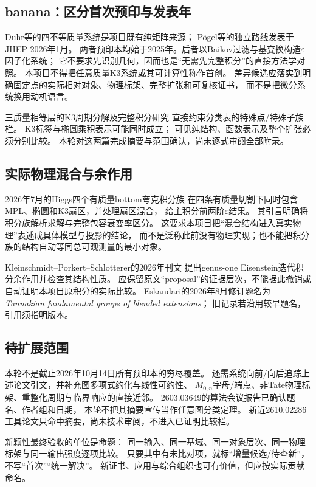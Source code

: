 \documentclass[11pt,a4paper]{ctexart}
\theoremstyle{cnplain}\newtheorem{proposition}{命题}[section]
\begin{document}
\subsection{banana：区分首次预印与发表年}
Duhr等\cite{DMPS}的四不等质量系统是项目既有纯矩阵来源；
Pögel等\cite{PTWW}的独立路线发表于JHEP 2026年1月。
两者预印本均始于2025年。后者以Baikov过滤与基变换构造$\varepsilon$因子化系统；
它不要求先识别几何，因而也是“无需先完整积分”的直接方法学对照。
本项目不得把任意质量K3系统或其可计算性称作首创。
差异候选应落实到明确固定点的实际相对对象、物理标架、完整扩张和可复核证书，
而不是把微分系统换用动机语言。

三质量相等层的K3周期分解及完整积分研究\cite{DM,DMfull}
直接约束分类表的特殊点/特殊子族栏。
K3标签与椭圆乘积表示可能同时成立；
可见纯结构、函数表示及整个扩张必须分别比较。
本轮对这两篇完成摘要与范围确认，尚未逐式审阅全部附录。

\subsection{实际物理混合与余作用}
2026年7月的Higgs四个有质量bottom夸克积分族\cite{WWW}
在四条有质量切割下同时包含MPL、椭圆和K3扇区，并处理扇区混合，
给主积分前两阶$\varepsilon$结果。
其引言明确将积分族解析求解与完整包容衰变率区分。
这要求本项目把“混合结构进入真实物理”表述成具体模型与投影的结论，
而不是泛称此前没有物理实现；也不能把积分族的结构自动等同总可观测量的最小对象。

Kleinschmidt--Porkert--Schlotterer的2026年刊文\cite{KPS}
提出genus-one Eisenstein迭代积分余作用并检查其结构性质。
应保留原文“proposal”的证据层次，不能据此撤销或自动证明本项目原积分的实际比较。
Eskandari的2026年8月修订\cite{Esk}题名为
\emph{Tannakian fundamental groups of blended extensions}；
旧记录若沿用较早题名，引用须指明版本。

\subsection{待扩展范围}
本轮不是截止2026年10月14日所有预印本的穷尽覆盖。
还需系统向前/向后追踪上述论文引文，并补充图多项式约化与线性可约性、
$M_{0,n}$字母/端点、非Tate物理标架、重整化周期与临界响应的直接近邻。
2603.03649的算法会议报告已确认题名、作者组和日期，
本轮不把其摘要宣传当作任意图分类定理。
新近2610.02286工具论文只命中摘要，尚未技术审阅，不进入已证明比较栏。

新颖性最终验收的单位是命题：
同一输入、同一基域、同一对象层次、同一物理标架与同一输出强度逐项比较。
只要其中有未比对项，就标“增量候选/待查新”，不写“首次”“统一解决”。
新证书、应用与综合组织也可有价值，但应按实际贡献命名。
\end{document}

